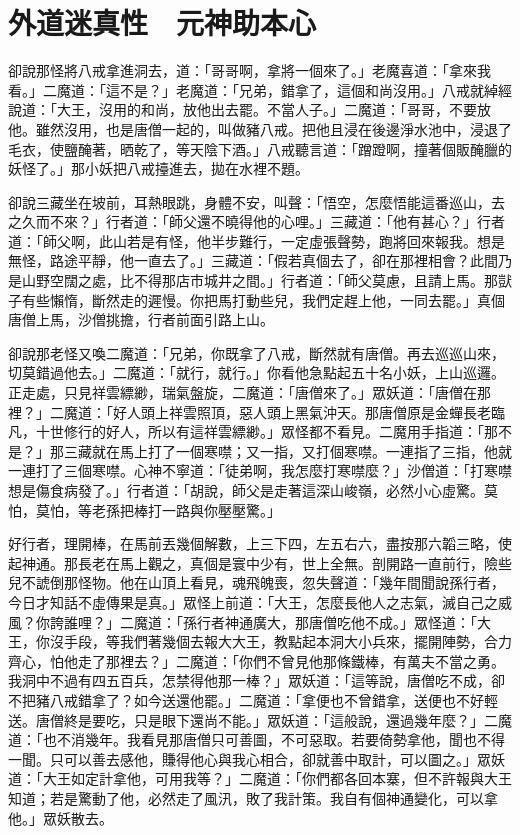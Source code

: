 
\chapter{外道迷真性　元神助本心}

卻說那怪將八戒拿進洞去，道：「哥哥啊，拿將一個來了。」老魔喜道：「拿來我看。」二魔道：「這不是？」老魔道：「兄弟，錯拿了，這個和尚沒用。」八戒就綽經說道：「大王，沒用的和尚，放他出去罷。不當人子。」二魔道：「哥哥，不要放他。雖然沒用，也是唐僧一起的，叫做豬八戒。把他且浸在後邊淨水池中，浸退了毛衣，使鹽醃著，晒乾了，等天陰下酒。」八戒聽言道：「蹭蹬啊，撞著個販醃臘的妖怪了。」那小妖把八戒擡進去，拋在水裡不題。

卻說三藏坐在坡前，耳熱眼跳，身體不安，叫聲：「悟空，怎麼悟能這番巡山，去之久而不來？」行者道：「師父還不曉得他的心哩。」三藏道：「他有甚心？」行者道：「師父啊，此山若是有怪，他半步難行，一定虛張聲勢，跑將回來報我。想是無怪，路途平靜，他一直去了。」三藏道：「假若真個去了，卻在那裡相會？此間乃是山野空闊之處，比不得那店市城井之間。」行者道：「師父莫慮，且請上馬。那獃子有些懶惰，斷然走的遲慢。你把馬打動些兒，我們定趕上他，一同去罷。」真個唐僧上馬，沙僧挑擔，行者前面引路上山。

卻說那老怪又喚二魔道：「兄弟，你既拿了八戒，斷然就有唐僧。再去巡巡山來，切莫錯過他去。」二魔道：「就行，就行。」你看他急點起五十名小妖，上山巡邏。正走處，只見祥雲縹緲，瑞氣盤旋，二魔道：「唐僧來了。」眾妖道：「唐僧在那裡？」二魔道：「好人頭上祥雲照頂，惡人頭上黑氣沖天。那唐僧原是金蟬長老臨凡，十世修行的好人，所以有這祥雲縹緲。」眾怪都不看見。二魔用手指道：「那不是？」那三藏就在馬上打了一個寒噤；又一指，又打個寒噤。一連指了三指，他就一連打了三個寒噤。心神不寧道：「徒弟啊，我怎麼打寒噤麼？」沙僧道：「打寒噤想是傷食病發了。」行者道：「胡說，師父是走著這深山峻嶺，必然小心虛驚。莫怕，莫怕，等老孫把棒打一路與你壓壓驚。」

好行者，理開棒，在馬前丟幾個解數，上三下四，左五右六，盡按那六韜三略，使起神通。那長老在馬上觀之，真個是寰中少有，世上全無。剖開路一直前行，險些兒不諕倒那怪物。他在山頂上看見，魂飛魄喪，忽失聲道：「幾年間聞說孫行者，今日才知話不虛傳果是真。」眾怪上前道：「大王，怎麼長他人之志氣，滅自己之威風？你誇誰哩？」二魔道：「孫行者神通廣大，那唐僧吃他不成。」眾怪道：「大王，你沒手段，等我們著幾個去報大大王，教點起本洞大小兵來，擺開陣勢，合力齊心，怕他走了那裡去？」二魔道：「你們不曾見他那條鐵棒，有萬夫不當之勇。我洞中不過有四五百兵，怎禁得他那一棒？」眾妖道：「這等說，唐僧吃不成，卻不把豬八戒錯拿了？如今送還他罷。」二魔道：「拿便也不曾錯拿，送便也不好輕送。唐僧終是要吃，只是眼下還尚不能。」眾妖道：「這般說，還過幾年麼？」二魔道：「也不消幾年。我看見那唐僧只可善圖，不可惡取。若要倚勢拿他，聞也不得一聞。只可以善去感他，賺得他心與我心相合，卻就善中取計，可以圖之。」眾妖道：「大王如定計拿他，可用我等？」二魔道：「你們都各回本寨，但不許報與大王知道；若是驚動了他，必然走了風汛，敗了我計策。我自有個神通變化，可以拿他。」眾妖散去。

